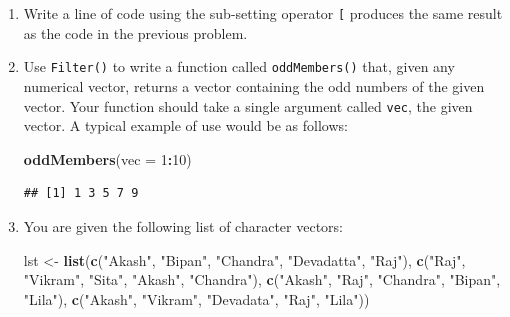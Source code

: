 \documentclass[]{book}
\makeatletter
\newenvironment{Shaded}{\begin{snugshade}}{\end{snugshade}}
\newcommand{\KeywordTok}[1]{\textcolor[rgb]{0.13,0.29,0.53}{\textbf{#1}}}
\newcommand{\DataTypeTok}[1]{\textcolor[rgb]{0.13,0.29,0.53}{#1}}
\newcommand{\DecValTok}[1]{\textcolor[rgb]{0.00,0.00,0.81}{#1}}
\newcommand{\StringTok}[1]{\textcolor[rgb]{0.31,0.60,0.02}{#1}}
\newcommand{\ControlFlowTok}[1]{\textcolor[rgb]{0.13,0.29,0.53}{\textbf{#1}}}
\newcommand{\OperatorTok}[1]{\textcolor[rgb]{0.81,0.36,0.00}{\textbf{#1}}}
\newcommand{\NormalTok}[1]{#1}
\newenvironment{kframe}{%
\medskip{}
\setlength{\fboxsep}{.8em}
 \def\at@end@of@kframe{}%
 \ifinner\ifhmode%
  \def\at@end@of@kframe{\end{minipage}}%
  \begin{minipage}{\columnwidth}%
 \fi\fi%
 \def\FrameCommand##1{\hskip\@totalleftmargin \hskip-\fboxsep
 \colorbox{shadecolor}{##1}\hskip-\fboxsep
     \hskip-\linewidth \hskip-\@totalleftmargin \hskip\columnwidth}%
 \MakeFramed {\advance\hsize-\width
   \@totalleftmargin\z@ \linewidth\hsize
   \@setminipage}}%
 {\par\unskip\endMakeFramed%
 \at@end@of@kframe}
\renewenvironment{Shaded}{\begin{kframe}}{\end{kframe}}
\theoremstyle{definition}
\theoremstyle{definition}
\theoremstyle{definition}
\theoremstyle{remark}
\makeatother
\begin{document}
{\begin{enumerate}
\begin{Shaded}
\begin{Highlighting}[]
\KeywordTok{Filter}\NormalTok{(}\ControlFlowTok{function}\NormalTok{(x) x }\OperatorTok{>=}\StringTok{ }\DecValTok{4}\NormalTok{, y)}
\end{Highlighting}
\end{Shaded}
\item
  Write a line of code using the sub-setting operator \texttt{{[}}
  produces the same result as the code in the previous problem.
\item
  Use \texttt{Filter()} to write a function called \texttt{oddMembers()}
  that, given any numerical vector, returns a vector containing the odd
  numbers of the given vector. Your function should take a single
  argument called \texttt{vec}, the given vector. A typical example of
  use would be as follows:

\begin{Shaded}
\begin{Highlighting}[]
\KeywordTok{oddMembers}\NormalTok{(}\DataTypeTok{vec =} \DecValTok{1}\OperatorTok{:}\DecValTok{10}\NormalTok{)}
\end{Highlighting}
\end{Shaded}

\begin{verbatim}
## [1] 1 3 5 7 9
\end{verbatim}
\item
  You are given the following list of character vectors:

\begin{Shaded}
\begin{Highlighting}[]
\NormalTok{   lst <-}\StringTok{ }\KeywordTok{list}\NormalTok{(}\KeywordTok{c}\NormalTok{(}\StringTok{"Akash"}\NormalTok{, }\StringTok{"Bipan"}\NormalTok{, }\StringTok{"Chandra"}\NormalTok{, }\StringTok{"Devadatta"}\NormalTok{, }\StringTok{"Raj"}\NormalTok{),}
        \KeywordTok{c}\NormalTok{(}\StringTok{"Raj"}\NormalTok{, }\StringTok{"Vikram"}\NormalTok{, }\StringTok{"Sita"}\NormalTok{, }\StringTok{"Akash"}\NormalTok{, }\StringTok{"Chandra"}\NormalTok{),}
        \KeywordTok{c}\NormalTok{(}\StringTok{"Akash"}\NormalTok{, }\StringTok{"Raj"}\NormalTok{, }\StringTok{"Chandra"}\NormalTok{, }\StringTok{"Bipan"}\NormalTok{, }\StringTok{"Lila"}\NormalTok{),}
        \KeywordTok{c}\NormalTok{(}\StringTok{"Akash"}\NormalTok{, }\StringTok{"Vikram"}\NormalTok{, }\StringTok{"Devadata"}\NormalTok{, }\StringTok{"Raj"}\NormalTok{, }\StringTok{"Lila"}\NormalTok{))}
\end{Highlighting}
\end{Shaded}


\end{enumerate}}
\end{document}
